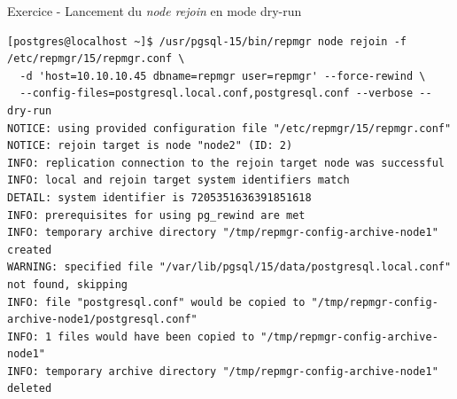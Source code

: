 \begin{frame}[fragile]{Exercice - Lancement du \textit{node rejoin} en mode dry-run}

   \begin{itemize}
\begin{tiny}
\begin{Verbatim}[commandchars=\&\{\}]
[postgres@localhost ~]$ /usr/pgsql-15/bin/repmgr node rejoin -f /etc/repmgr/15/repmgr.conf \
  -d 'host=10.10.10.45 dbname=repmgr user=repmgr' --force-rewind \
  --config-files=postgresql.local.conf,postgresql.conf --verbose --dry-run
NOTICE: using provided configuration file "/etc/repmgr/15/repmgr.conf"                                                                                                                        
NOTICE: rejoin target is node "node2" (ID: 2)                                                                                                                                                 
INFO: replication connection to the rejoin target node was successful                                                                                                                         
INFO: local and rejoin target system identifiers match                                                                                                                                        
DETAIL: system identifier is 7205351636391851618                                                                                                                                              
INFO: prerequisites for using pg_rewind are met                                                                                                                                               
INFO: temporary archive directory "/tmp/repmgr-config-archive-node1" created                                                                                                                  
WARNING: specified file "/var/lib/pgsql/15/data/postgresql.local.conf" not found, skipping                                                                                                    
INFO: file "postgresql.conf" would be copied to "/tmp/repmgr-config-archive-node1/postgresql.conf"                                                                                            
INFO: 1 files would have been copied to "/tmp/repmgr-config-archive-node1"                                                                                                                    
INFO: temporary archive directory "/tmp/repmgr-config-archive-node1" deleted                                                                                                                  

\end{Verbatim}
\end{tiny}
\end{itemize}
\end{frame}
